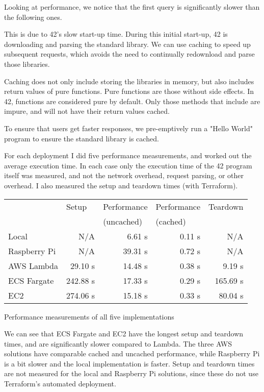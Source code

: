 Looking at performance, we notice that the first query is significantly slower than the following ones.

This is due to 42's slow start-up time. During this initial start-up, 42 is downloading and parsing the standard library. We can use caching to speed up subsequent requests, which avoids the need to continually redownload and parse those libraries.

Caching does not only include storing the libraries in memory, but also includes return values of pure functions. Pure functions are those without side effects. In 42, functions are considered pure by default. Only those methods that include \code{\#\$} are impure, and will not have their return values cached.

To ensure that users get faster responses, we pre-emptively run a "Hello World" program to ensure the standard library is cached.

For each deployment I did five performance measurements, and worked out the average execution time. In each case only the execution time of the 42 program itself was measured, and not the network overhead, request parsing, or other overhead. I also measured the setup and teardown times (with Terraform).

\begin{fig}[H]
\begin{center}
\begin{tabular}{|l|r|r|r|r|}
\hline
\rowcolor{tableheadercolour}
& \multicolumn{1}{l|}{Setup} & \multicolumn{1}{l|}{Performance} & \multicolumn{1}{l|}{Performance} & \multicolumn{1}{l|}{Teardown} \\
\rowcolor{tableheadercolour}
& & \multicolumn{1}{l|}{(uncached)} & \multicolumn{1}{l|}{(cached)} & \\ \hline
Local & N/A & 6.61 s & 0.11 s & N/A \\ \hline
Raspberry Pi & N/A & 39.31 s & 0.72 s & N/A \\ \hline
AWS Lambda & 29.10 s & 14.48 s & 0.38 s & 9.19 s \\ \hline
ECS Fargate & 242.88 s & 17.33 s & 0.29 s & 165.69 s \\ \hline
EC2 & 274.06 s & 15.18 s & 0.33 s & 80.04 s \\ \hline
\end{tabular}
\caption{Performance measurements of all five implementations}
\end{center}
\end{fig}

We can see that ECS Fargate and EC2 have the longest setup and teardown times, and are significantly slower compared to Lambda. The three AWS solutions have comparable cached and uncached performance, while Raspberry Pi is a bit slower and the local implementation is faster. Setup and teardown times are not measured for the local and Raspberry Pi solutions, since these do not use Terraform's automated deployment.

